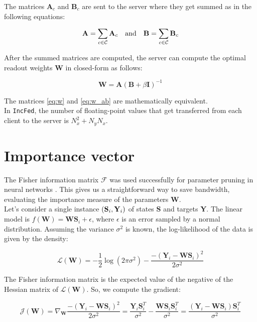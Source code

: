 The matrices $\textbf{A}_c$ and $\textbf{B}_c$ are sent to the server where they get summed as in the following equations:

\begin{equation}
    \textbf{A}=\sum_{c\in\mathcal{C}}\textbf{A}_c\text{\quad and\quad}\textbf{B}=\sum_{c\in\mathcal{C}}\textbf{B}_c
\end{equation}

After the summed matrices are computed, the server can compute the optimal readout weights $\textbf{W}$ in closed-form as follows:

\begin{equation}\label{eq:w_ab}
    \textbf{W}=\textbf{A}(\textbf{B}+\beta\textbf{I})^{-1}
\end{equation}

The matrices \ref{eq:w} and \ref{eq:w_ab} are mathematically equivalent.\\

In \texttt{IncFed}, the number of floating-point values that get transferred from each client to the server is $N_x^2+N_yN_x$.

\section{Importance vector}

The Fisher information matrix $\mathcal{F}$ was used successfully for parameter pruning in neural networks \cite{lecun1989optimal}. This gives us a straightforward way to save bandwidth, evaluating the importance measure of the parameters $\textbf{W}$.\\

Let's consider a single instance $({\bf S}_i, {\bf Y}_i)$ of states \textbf{S} and targets \textbf{Y}. The linear model is $f(\textbf{W})=\textbf{WS}_i+\epsilon$, where $\epsilon$ is an error sampled by a normal distribution. Assuming the variance $\sigma^2$ is known, the log-likelihood of the data is given by the density:

\begin{equation}
    \mathcal{L}(\textbf{W})=-\frac{1}{2}\log(2\pi\sigma^2)-\frac{-(\textbf{Y}_i-\textbf{WS}_i)^2}{2\sigma^2}
\end{equation}

The Fisher information matrix is the expected value of the negative of the Hessian matrix of $\mathcal{L}(\textbf{W})$. So, we compute the gradient:

\begin{equation}
    \mathcal{J}(\textbf{W})=\nabla_{\textbf{W}} \frac{-(\textbf{Y}_i-\textbf{WS}_i)^2}{2\sigma^2}=\frac{\textbf{Y}_i\textbf{S}_i^T}{\sigma^2}-\frac{\textbf{WS}_i\textbf{S}_i^T}{\sigma^2}=\frac{(\textbf{Y}_i-\textbf{WS}_i)\textbf{S}_i^T}{\sigma^2}
\end{equation}


